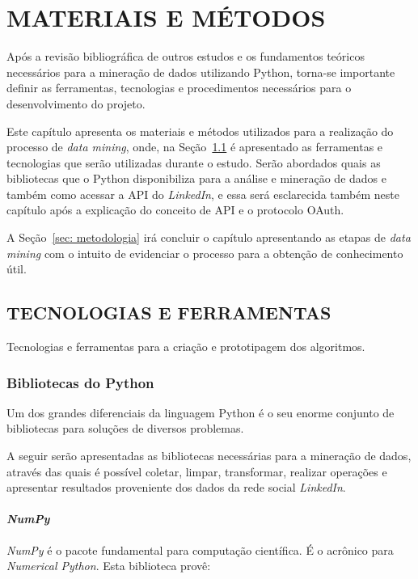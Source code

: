 \chapter{MATERIAIS E MÉTODOS}\label{ch:materiais-metodos}
Após a revisão bibliográfica de outros estudos e os fundamentos teóricos necessários para a mineração de dados utilizando Python, torna-se importante definir as ferramentas, tecnologias e procedimentos necessários para o desenvolvimento do projeto.

Este capítulo apresenta os materiais e métodos utilizados para a realização do processo de \textit{data mining}, onde, na Seção~\ref{sec: tec-ferramenta} é apresentado as ferramentas e tecnologias que serão utilizadas durante o estudo. Serão abordados quais as bibliotecas que o Python disponibiliza para a análise e mineração de dados e também como acessar a API do \textit{LinkedIn}, e essa será esclarecida também neste capítulo após a explicação do conceito de API e o protocolo OAuth.

A Seção~\ref{sec: metodologia} irá concluir o capítulo apresentando as etapas de \textit{data mining} com o intuito de evidenciar o processo para a obtenção de conhecimento útil.

\section{TECNOLOGIAS E FERRAMENTAS}\label{sec: tec-ferramenta}
Tecnologias e ferramentas para a criação e prototipagem dos algoritmos.

\subsection{Bibliotecas do Python}\label{sec:bib_python}
Um dos grandes diferenciais da linguagem Python é o seu enorme conjunto de bibliotecas para soluções de diversos problemas.

A seguir serão apresentadas as bibliotecas necessárias para a mineração de dados, através das quais é possível coletar, limpar, transformar, realizar operações e apresentar resultados proveniente dos dados da rede social \textit{LinkedIn}.
 
\subsubsection{\textbf{\textit{NumPy}}}
\textit{NumPy} é o pacote fundamental para computação científica. É o acrônico para \textit{Numerical Python}. Esta biblioteca provê:

